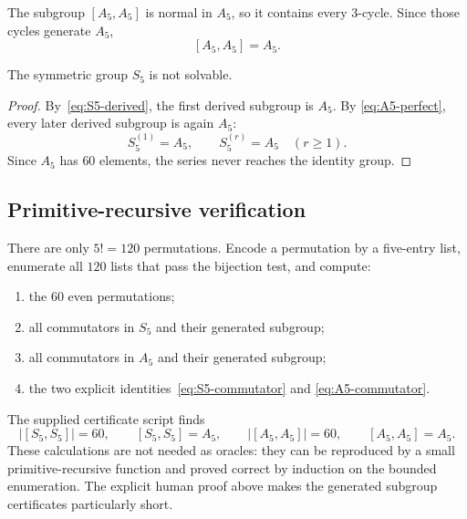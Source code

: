 The subgroup $[A_5,A_5]$ is normal in $A_5$, so it contains every $3$-cycle.
Since those cycles generate $A_5$,
\[
 [A_5,A_5]=A_5.
 \tag{S5}\label{eq:A5-perfect}
\]

\begin{theorem}[Nonsolvability of $S_5$]
\label{thm:S5-not-solvable}
The symmetric group $S_5$ is not solvable.
\end{theorem}

\begin{proof}
By~\eqref{eq:S5-derived}, the first derived subgroup is $A_5$.  By
\eqref{eq:A5-perfect}, every later derived subgroup is again $A_5$:
\[
 S_5^{(1)}=A_5,
 \qquad
 S_5^{(r)}=A_5\quad(r\ge1).
\]
Since $A_5$ has $60$ elements, the series never reaches the identity group.
\end{proof}

\subsection{Primitive-recursive verification}

There are only $5!=120$ permutations.  Encode a permutation by a five-entry
list, enumerate all $120$ lists that pass the bijection test, and compute:

\begin{enumerate}
\item the $60$ even permutations;
\item all commutators in $S_5$ and their generated subgroup;
\item all commutators in $A_5$ and their generated subgroup;
\item the two explicit identities~\eqref{eq:S5-commutator} and
  \eqref{eq:A5-commutator}.
\end{enumerate}

The supplied certificate script finds
\[
 |[S_5,S_5]|=60,
 \qquad
 [S_5,S_5]=A_5,
 \qquad
 |[A_5,A_5]|=60,
 \qquad
 [A_5,A_5]=A_5.
\]
These calculations are not needed as oracles: they can be reproduced by a
small primitive-recursive function and proved correct by induction on the
bounded enumeration.  The explicit human proof above makes the generated
subgroup certificates particularly short.
